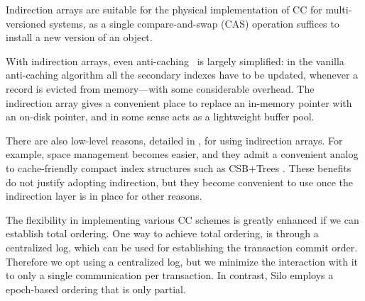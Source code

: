Indirection arrays are suitable for the physical implementation of CC for multi-versioned systems, as a single compare-and-swap (CAS) operation suffices to install a new version of an object. 

With indirection arrays, even anti-caching~\cite{DeBrabantPTSZ13} is largely simplified: in the vanilla anti-caching algorithm all the secondary indexes have to be updated, whenever a record is evicted from memory---with some considerable overhead. The indirection array gives a convenient place to replace an in-memory pointer with an on-disk pointer, and in some sense acts as a lightweight buffer pool. 

There are also low-level reasons, detailed in , for using indirection arrays. For example, space management becomes easier, and they admit a convenient analog to cache-friendly compact index structures such as CSB+Trees \cite{RaoR00}. These benefits do not justify adopting indirection, but they become convenient to use once the indirection layer is in place for other reasons.

The flexibility in implementing various CC schemes is greatly enhanced if we can establish total ordering. One way to achieve total ordering, is through a centralized log, which can be used for establishing the transaction commit order. Therefore we opt using a centralized log, but we minimize the interaction with it to only a single communication per transaction. 
In contrast, Silo employs a epoch-based ordering that is only partial. 
